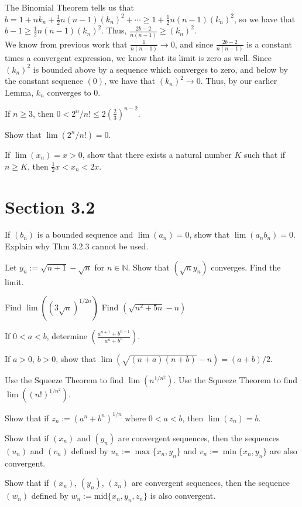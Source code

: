 \documentclass[paper=a4, fontsize=11pt]{scrartcl} %
\numberwithin{equation}{section} %
\numberwithin{figure}{section} %
\numberwithin{table}{section} %
\begin{document}
The Binomial Theorem tells us that $b = 1 + n k_n + \frac{1}{2} n (n-1) (k_n)^2 + \cdots \geq 1 + \frac{1}{2} n (n-1) (k_n)^2$, so we have that $b - 1 \geq \frac{1}{2} n (n-1) (k_n)^2$. Thus, $\frac{2b - 2}{n(n-1)} \geq (k_n)^2$.\\

We know from previous work that $\frac{1}{n(n-1)} \rightarrow 0$, and since $\frac{2b - 2}{n(n-1)}$ is a constant times a convergent expression, we know that its limit is zero as well. Since $(k_n)^2$ is bounded above by a sequence which converges to zero, and below by the constant sequence $(0)$, we have that $(k_n)^2 \rightarrow 0$. Thus, by our earlier Lemma, $k_n$ converges to 0. \done

 If $n \geq 3$, then $0 < 2^n/n! \leq 2(\frac{2}{3})^{n-2}$.

\pf

 Show that $\lim(2^n/n!) = 0$.

\pf

 If $\lim(x_n) = x > 0$, show that there exists a natural number $K$ such that if $n \geq K$, then $\frac{1}{2}x < x_n < 2x$.
\pf

\section*{Section 3.2}
 If $(b_n)$ is a bounded sequence and $\lim(a_n) = 0$, show that $\lim(a_n b_n) = 0$. Explain why Thm 3.2.3 cannot be used.
\pf

 Let $y_n := \sqrt{n+1} - \sqrt{n}$ for $n \in \mathbb{N}$. Show that $(\sqrt{n} y_n)$ converges. Find the limit.
\pf

 Find $\lim\left((3\sqrt{n})^{1/2n}\right)$
\pf
{} Find $(\sqrt{n^2 + 5n} - n)$
\pf

\newcommand{\anp}{a^{n+1}}
\newcommand{\bnp}{b^{n+1}}
 If $0 < a < b$, determine $\left(\frac{\anp + \bnp}{a^n + b^n}\right)$.
\pf

 If $a > 0$, $b > 0$, show that $\lim\left(\sqrt{(n+a)(n+b)} - n\right) = (a + b)/2$.
\pf

 Use the Squeeze Theorem to find $\lim(n^{1/n^2})$.
\pf
{} Use the Squeeze Theorem to find $\lim((n!)^{1/n^2})$.
\pf

 Show that if $z_n := (a^n + b^n)^{1/n}$ where $0 < a < b$, then $\lim(z_n) = b$.
\pf

 Show that if $(x_n)$ and $(y_n)$ are convergent sequences, then the sequences $(u_n)$ and $(v_n)$ defined by $u_n := \max\{x_n, y_n\}$ and $v_n := \min\{x_n, y_n\}$ are also convergent.
\pf

 Show that if $(x_n)$, $(y_n)$, $(z_n)$ are convergent sequences, then the sequence $(w_n)$ defined by $w_n := \text{mid}\{x_n, y_n, z_n\}$ is also convergent.
\pf
\end{document}
